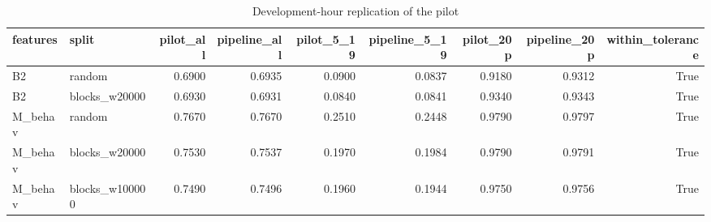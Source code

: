 \begin{table}
\caption{Development-hour replication of the pilot}
\label{tab:tab_dev_replication}
\begin{tabular}{llrrrrrrr}
\toprule
features & split & pilot\_all & pipeline\_all & pilot\_5\_19 & pipeline\_5\_19 & pilot\_20p & pipeline\_20p & within\_tolerance \\
\midrule
B2 & random & 0.6900 & 0.6935 & 0.0900 & 0.0837 & 0.9180 & 0.9312 & True \\
B2 & blocks\_w20000 & 0.6930 & 0.6931 & 0.0840 & 0.0841 & 0.9340 & 0.9343 & True \\
M\_behav & random & 0.7670 & 0.7670 & 0.2510 & 0.2448 & 0.9790 & 0.9797 & True \\
M\_behav & blocks\_w20000 & 0.7530 & 0.7537 & 0.1970 & 0.1984 & 0.9790 & 0.9791 & True \\
M\_behav & blocks\_w100000 & 0.7490 & 0.7496 & 0.1960 & 0.1944 & 0.9750 & 0.9756 & True \\
\bottomrule
\end{tabular}
\end{table}
